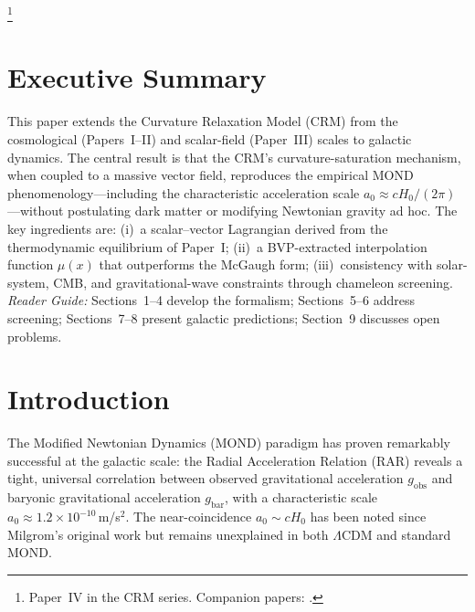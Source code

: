 \documentclass[aps,prd,twocolumn,superscriptaddress,nofootinbib]{revtex4-2}
\begin{document}
\thanks{Paper~IV in the CRM series. Companion papers: \cite{Geiger2026,Geiger2026b,Geiger2026c}.}

\maketitle


\section*{Executive Summary}

This paper extends the Curvature Relaxation Model (CRM) from the cosmological (Papers~I--II) and scalar-field (Paper~III) scales to galactic dynamics. The central result is that the CRM's curvature-saturation mechanism, when coupled to a massive vector field, reproduces the empirical MOND phenomenology---including the characteristic acceleration scale $a_0 \approx cH_0/(2\pi)$---without postulating dark matter or modifying Newtonian gravity ad hoc. The key ingredients are: (i)~a scalar--vector Lagrangian derived from the thermodynamic equilibrium of Paper~I; (ii)~a BVP-extracted interpolation function $\mu(x)$ that outperforms the McGaugh form; (iii)~consistency with solar-system, CMB, and gravitational-wave constraints through chameleon screening. \textit{Reader Guide:} Sections~1--4 develop the formalism; Sections~5--6 address screening; Sections~7--8 present galactic predictions; Section~9 discusses open problems.

\section{Introduction}
\label{sec:intro}

The Modified Newtonian Dynamics (MOND) paradigm \cite{Milgrom1983} has proven remarkably successful at the galactic scale: the Radial Acceleration Relation (RAR) \cite{McGaugh2016} reveals a tight, universal correlation between observed gravitational acceleration $g_{\mathrm{obs}}$ and baryonic gravitational acceleration $g_{\mathrm{bar}}$, with a characteristic scale $a_0 \approx 1.2 \times 10^{-10}$\,m/s$^2$. The near-coincidence $a_0 \sim cH_0$ has been noted since Milgrom's original work but remains unexplained in both $\Lambda$CDM and standard MOND.
\end{document}
